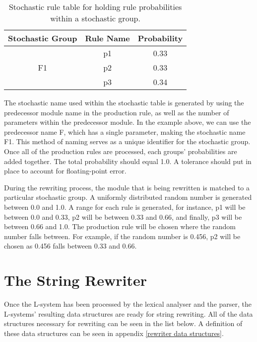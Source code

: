 \begin{table}[h!] \center
\begin{tabular}{ | c | c | c | }
\hline
	Stochastic Group & Rule Name & Probability\\  
\hline
\hline
\multirow{3}{*}{F1} & p1 & 0.33 \\
& p2 & 0.33 \\
& p3 & 0.34 \\
\hline
\end{tabular}
\caption{Stochastic rule table for holding rule probabilities within a stochastic group.}
\label{stochastic table}
\end{table}
\FloatBarrier

\vspace{5mm}
\noindent
The stochastic name used within the stochastic table is generated by using the predecessor module name in the production rule, as well as the number of parameters within the predecessor module. In the example above, we can use the predecessor name F, which has a single parameter, making the stochastic name F1. This method of naming serves as a unique identifier for the stochastic group. Once all of the production rules are processed, each groups' probabilities are added together. The total probability should equal 1.0. A tolerance should put in place to account for floating-point error.

During the rewriting process, the module that is being rewritten is matched to a particular stochastic group. A uniformly distributed random number is generated between 0.0 and 1.0. A range for each rule is generated, for instance, p1 will be between 0.0 and 0.33, p2 will be between 0.33 and 0.66, and finally, p3 will be between 0.66 and 1.0. The production rule will be chosen where the random number falls between. For example, if the random number is 0.456, p2 will be chosen as 0.456 falls between 0.33 and 0.66.

\section{The String Rewriter}

Once the L-system has been processed by the lexical analyser and the parser, the L-systems' resulting data structures are ready for string rewriting. All of the data structures necessary for rewriting can be seen in the list below. A definition of these data structures can be seen in appendix \ref{rewriter data structures}.

